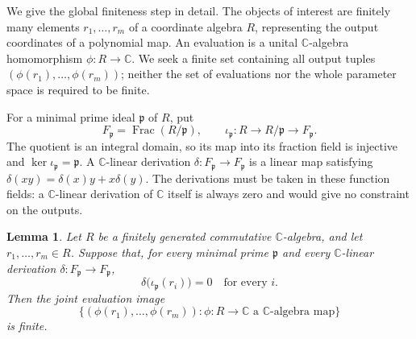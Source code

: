 \documentclass[aps,prl,reprint,notitlepage,nofootinbib,nobibnotes]{revtex4-2}
\newtheorem{lemma}{Lemma}
\begin{document}
We give the global finiteness step in detail. The objects of interest
are finitely many elements \(r_1,\ldots,r_m\) of a coordinate algebra
\(R\), representing the output coordinates of a polynomial map.
An evaluation is a unital \(\mathbb C\)-algebra homomorphism
\(\phi:R\to\mathbb C\). We seek a finite set containing all output
tuples \((\phi(r_1),\ldots,\phi(r_m))\); neither the set of evaluations
nor the whole parameter space is required to be finite.

For a minimal prime ideal \(\mathfrak p\) of \(R\), put
\[
 F_{\mathfrak p}=\operatorname{Frac}(R/\mathfrak p),\qquad
 \iota_{\mathfrak p}:R\longrightarrow R/\mathfrak p
                         \longrightarrow F_{\mathfrak p}.
\]
The quotient is an integral domain, so its map into its fraction
field is injective and \(\ker\iota_{\mathfrak p}=\mathfrak p\).
A \(\mathbb C\)-linear derivation \(\delta:F_{\mathfrak p}\to
F_{\mathfrak p}\) is a linear map satisfying
\(\delta(xy)=\delta(x)y+x\delta(y)\).
The derivations must be taken in these function fields: a
\(\mathbb C\)-linear derivation of \(\mathbb C\) itself is always zero
and would give no constraint on the outputs.

\begin{lemma}\label{lem:algebraic-finite-image}
Let \(R\) be a finitely generated commutative \(\mathbb C\)-algebra,
and let \(r_1,\ldots,r_m\in R\). Suppose that, for every minimal prime
\(\mathfrak p\) and every \(\mathbb C\)-linear derivation
\(\delta:F_{\mathfrak p}\to F_{\mathfrak p}\),
\[
 \delta\bigl(\iota_{\mathfrak p}(r_i)\bigr)=0
 \quad\text{for every }i.
\]
Then the joint evaluation image
\[
 \{(\phi(r_1),\ldots,\phi(r_m)):
          \phi:R\to\mathbb C\text{ a }\mathbb C\text{-algebra map}\}
\]
is finite.
\end{lemma}
\end{document}
